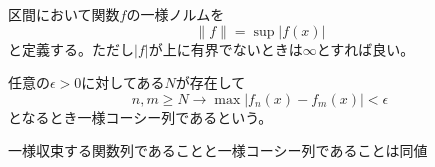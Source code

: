 	\begin{dfn}[一様ノルム]
		区間において関数$f$の一様ノルムを
			\[\|f\| = \sup|f(x)|\]
		と定義する。ただし$|f|$が上に有界でないときは$\infty$とすれば良い。
	\end{dfn}
	\begin{dfn}[一様コーシー列]
		任意の$\epsilon > 0$に対してある$N$が存在して
			\[n, m \geq N \rightarrow \max|f_n(x) - f_m(x)| < \epsilon\]
		となるとき一様コーシー列であるという。
	\end{dfn}
	\begin{prop}
		一様収束する関数列であることと一様コーシー列であることは同値
	\end{prop}